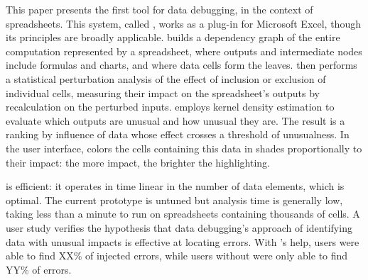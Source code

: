 This paper presents the first tool for data debugging, in the context
of spreadsheets. This system, called \checkcell{}, works as a plug-in
for Microsoft Excel, though its principles are broadly
applicable. \checkcell{} builds a dependency graph of the entire
computation represented by a spreadsheet, where outputs and
intermediate nodes include formulas and charts, and where data cells
form the leaves. \checkcell{} then performs a statistical perturbation
analysis of the effect of inclusion or exclusion of individual cells,
measuring their impact on the spreadsheet's outputs by recalculation
on the perturbed inputs. \checkcell{} employs kernel density
estimation to evaluate which outputs are unusual and how unusual they
are. The result is a ranking by influence of data whose effect crosses
a threshold of unusualness. In the user interface, \checkcell{} colors
the cells containing this data in shades proportionally to their
impact: the more impact, the brighter the highlighting.

\checkcell{} is efficient: it operates in time linear in the number
of data elements, which is optimal. The current prototype is untuned
but analysis time is generally low, taking less than a minute to run
on spreadsheets containing thousands of cells. A user study verifies
the hypothesis that data debugging's approach of identifying data with
unusual impacts is effective at locating errors. With \checkcell{}'s
help, users were able to find XX\% of injected errors, while users
without \checkcell{} were only able to find YY\% of errors.

